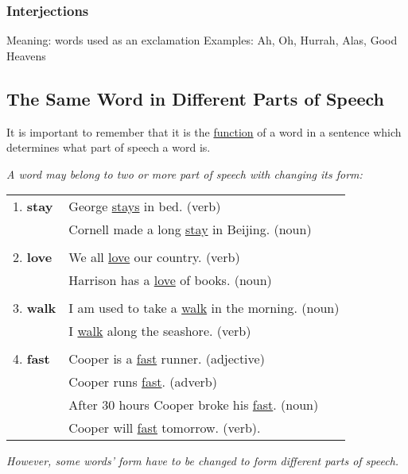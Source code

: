 \subsubsection{Interjections}
Meaning: words used as an exclamation
\newline
\newline
Examples: Ah, Oh, Hurrah, Alas, Good Heavens

\subsection{The Same Word in Different Parts of Speech}
It is important to remember that it is the \underline{function} of a word in a
sentence which determines what part of speech a word is.
\newline

{\it A word may belong to two or more part of speech with changing its form:}
\newline

\begin{tabular}{ll}
    1. \textbf{stay} & George \underline{stays} in bed. (verb) \\
    & Cornell made a long \underline{stay} in Beijing. (noun) \\ \\
    2. \textbf{love} & We all \underline{love} our country. (verb) \\
    & Harrison has a \underline{love} of books. (noun) \\ \\
    3. \textbf{walk} & I am used to take a \underline{walk} in the morning. (noun) \\
    & I \underline{walk} along the seashore. (verb) \\ \\
    4. \textbf{fast} & Cooper is a \underline{fast} runner. (adjective) \\
    & Cooper runs \underline{fast}. (adverb) \\
    & After 30 hours Cooper broke his \underline{fast}. (noun) \\
    & Cooper will \underline{fast} tomorrow. (verb).
\end{tabular}
\newline

{\it However, some words' form have to be changed to form different parts of
speech.}
\newline

